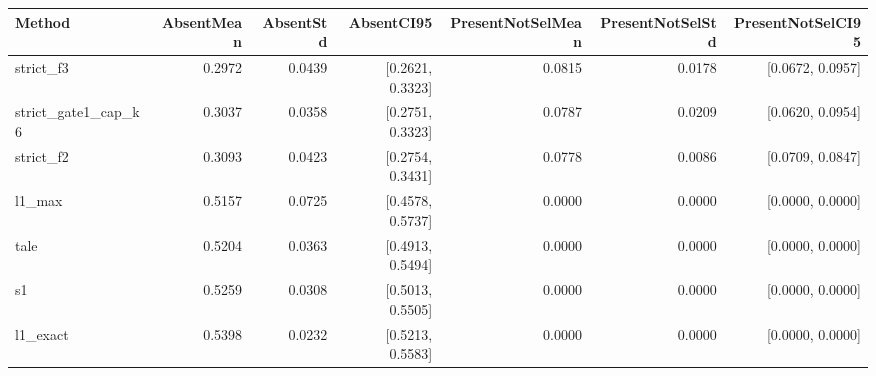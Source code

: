 \begin{tabular}{lrrrrrr}
\hline
Method & AbsentMean & AbsentStd & AbsentCI95 & PresentNotSelMean & PresentNotSelStd & PresentNotSelCI95 \\
\hline
strict_f3 & 0.2972 & 0.0439 & [0.2621, 0.3323] & 0.0815 & 0.0178 & [0.0672, 0.0957] \\
strict_gate1_cap_k6 & 0.3037 & 0.0358 & [0.2751, 0.3323] & 0.0787 & 0.0209 & [0.0620, 0.0954] \\
strict_f2 & 0.3093 & 0.0423 & [0.2754, 0.3431] & 0.0778 & 0.0086 & [0.0709, 0.0847] \\
l1_max & 0.5157 & 0.0725 & [0.4578, 0.5737] & 0.0000 & 0.0000 & [0.0000, 0.0000] \\
tale & 0.5204 & 0.0363 & [0.4913, 0.5494] & 0.0000 & 0.0000 & [0.0000, 0.0000] \\
s1 & 0.5259 & 0.0308 & [0.5013, 0.5505] & 0.0000 & 0.0000 & [0.0000, 0.0000] \\
l1_exact & 0.5398 & 0.0232 & [0.5213, 0.5583] & 0.0000 & 0.0000 & [0.0000, 0.0000] \\
\hline
\end{tabular}
